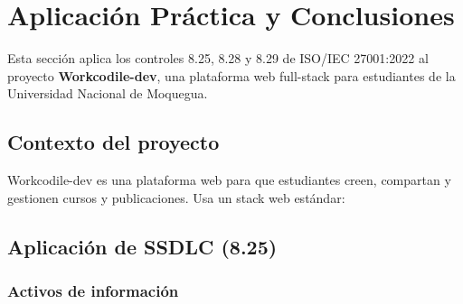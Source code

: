 \section{Aplicación Práctica y Conclusiones}
\label{sec:app-conclusion}

Esta sección aplica los controles 8.25, 8.28 y 8.29 de ISO/IEC 27001:2022 al proyecto \textbf{Workcodile-dev}, una plataforma web full-stack para estudiantes de la Universidad Nacional de Moquegua.

\subsection{Contexto del proyecto}

Workcodile-dev es una plataforma web para que estudiantes creen, compartan y gestionen cursos y publicaciones. Usa un stack web estándar:

\begin{table}[h]
\centering
\small
{}
\caption{Stack tecnológico de Workcodile-dev}
\label{tab:stack-conclusion}
\end{table}

\subsection{Aplicación de SSDLC (8.25)}

\subsubsection{Activos de información}

\begin{table}[h]
\centering
\small
{}
\caption{Activos de información de Workcodile-dev}
\label{tab:activos}
\end{table}

